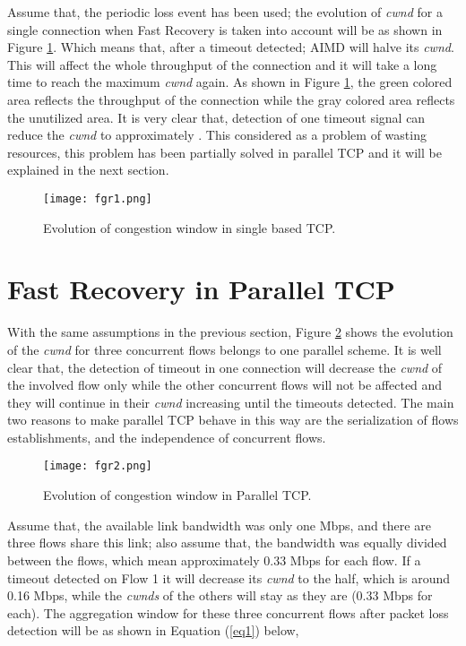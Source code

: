 \documentclass[a4paper, conference]{IEEEtran}
\begin{document}
Assume that, the periodic loss event has been used; the evolution of \textit{cwnd} for a single connection when Fast Recovery is taken into account will be as shown in Figure \ref{evo-single}. Which means that, after a timeout detected; AIMD will halve its \textit{cwnd}. This will affect the whole throughput of the connection and it will take a long time to reach the maximum \textit{cwnd} again. As shown in Figure \ref{evo-single}, the green colored area reflects the throughput of the connection while the gray colored area reflects the unutilized area. It is very clear that, detection of one timeout signal can reduce the \textit{cwnd} to approximately . This considered as a problem of wasting resources, this problem has been partially solved in parallel TCP and it will be explained in the next section.

\begin{figure}[h]
\centerline{\texttt{[image: fgr1.png]}}
\caption{Evolution of congestion window in single based TCP.}
\label{evo-single}
\end{figure}

\section{Fast Recovery in Parallel TCP}

With the same assumptions in the previous section, Figure \ref{evo-parallel} shows the evolution of the \textit{cwnd} for three concurrent flows belongs to one parallel scheme. It is well clear that, the detection of timeout in one connection will decrease the \textit{cwnd} of the involved flow only while the other concurrent flows will not be affected and they will continue in their \textit{cwnd} increasing until the timeouts detected. The main two reasons to make parallel TCP behave in this way are the serialization of flows establishments, and the independence of concurrent flows.

\begin{figure}[h]
\centerline{\texttt{[image: fgr2.png]}}
\caption{Evolution of congestion window in Parallel TCP.}
\label{evo-parallel}
\end{figure}

Assume that, the available link bandwidth was only one Mbps, and there are three flows share this link; also assume that, the bandwidth was equally divided between the flows, which mean approximately 0.33 Mbps for each flow. If a timeout detected on Flow 1 it will decrease its \textit{cwnd} to the half, which is around 0.16 Mbps, while the \textit{cwnds} of the others will stay as they are (0.33 Mbps for each). The aggregation window for these three concurrent flows after packet loss detection will be as shown in Equation (\ref{eq1}) below,
\end{document}
